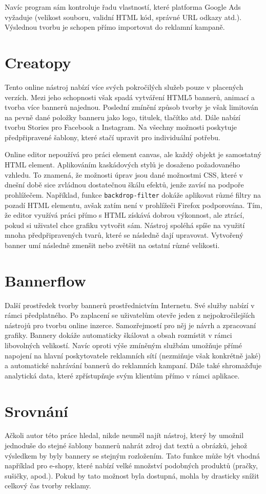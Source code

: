 Navíc program sám kontroluje řadu vlastností, které platforma Google Ads vyžaduje
(velikost souboru, validní HTML kód, správné URL odkazy atd.). Výslednou tvorbu je schopen přímo importovat do reklamní kampaně.

\section{Creatopy}
Tento online nástroj nabízí více svých pokročilých služeb pouze v placených verzích. Mezi jeho schopnosti však spadá vytváření HTML5 bannerů,
animací a tvorba více bannerů najednou. Poslední zmínění způsob tvorby je však limitován na pevně dané položky banneru jako logo, titulek,
tlačítko atd. Dále nabízí tvorbu Stories pro Facebook a Instagram. Na všechny možnosti poskytuje předpřipravené šablony,
které stačí upravit pro individuální potřebu.

Online editor nepoužívá pro práci element canvas, ale každý objekt je samostatný HTML element. Aplikováním kaskádových stylů je dosaženo požadovaného vzhledu.
To znamená, že možnosti úprav jsou dané možnostmi CSS, které v dnešní době sice zvládnou dostatečnou škálu efektů, jenže zavísí na podpoře prohlížečem.
Například, funkce \texttt{backdrop-filter} dokáže aplikovat různé filtry na pozadí HTML elementu, avšak zatím není v prohlížeči Firefox podporována.
Tím, že editor využívá práci přímo s HTML získává dobrou výkonnost, ale ztrácí, pokud si uživatel chce grafiku vytvořit sám.
Nástroj spoléhá spíše na využití mnoha předpřipravených tvarů, které se následně dají upravovat. Vytvořený banner umí následně zmenšit nebo
zvětšit na ostatní různé velikosti.

\section{Bannerflow}
Další prostředek tvorby bannerů prostřednictvím Internetu. Své služby nabízí v rámci předplatného.
Po zaplacení se uživatelům otevře jeden z nejpokročilejších nástrojů pro tvorbu online inzerce.
Samozřejmostí pro něj je návrh a zpracovaní grafiky. Bannery dokáže automaticky škálovat a obsah rozmístit v rámci libovolných velikostí.
Navíc oproti výše zmíněným službám umožňuje přímé napojení na hlavní poskytovatele reklamních sítí (nezmiňuje však konkrétně jaké) a
automatické nahrávání bannerů do reklamních kampaní. Dále také shromažďuje analytická data, které zpřístupňuje svým klientům přímo v rámci aplikace.

\section{Srovnání}
Ačkoli autor této práce hledal, nikde neuměl najít nástroj, který by umožnil jednoduše do stejné šablony bannerů nahrát zdroj dat textů a obrázků,
jehož výsledkem by byly bannery se stejným rozložením. Tato funkce může být vhodná například pro e-shopy,
které nabízí velké množství podobných produktů (pračky, sušičky, apod.). Pokud by tato možnost byla dostupná,
mohla by drasticky snížit celkový čas tvorby reklamy. 



\endinput
